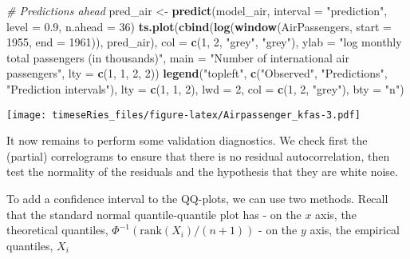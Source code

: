\documentclass[]{book}
\newenvironment{Shaded}{\begin{snugshade}}{\end{snugshade}}
\newcommand{\CommentTok}[1]{\textcolor[rgb]{0.56,0.35,0.01}{\textit{#1}}}
\newcommand{\DataTypeTok}[1]{\textcolor[rgb]{0.13,0.29,0.53}{#1}}
\newcommand{\DecValTok}[1]{\textcolor[rgb]{0.00,0.00,0.81}{#1}}
\newcommand{\FloatTok}[1]{\textcolor[rgb]{0.00,0.00,0.81}{#1}}
\newcommand{\KeywordTok}[1]{\textcolor[rgb]{0.13,0.29,0.53}{\textbf{#1}}}
\newcommand{\NormalTok}[1]{#1}
\newcommand{\StringTok}[1]{\textcolor[rgb]{0.31,0.60,0.02}{#1}}
\begin{document}
\begin{Shaded}
\begin{Highlighting}[]
\CommentTok{# Predictions ahead}
\NormalTok{pred_air <-}\StringTok{ }\KeywordTok{predict}\NormalTok{(model_air, }\DataTypeTok{interval =} \StringTok{"prediction"}\NormalTok{, }\DataTypeTok{level =} \FloatTok{0.9}\NormalTok{, }\DataTypeTok{n.ahead =} \DecValTok{36}\NormalTok{)}
\KeywordTok{ts.plot}\NormalTok{(}\KeywordTok{cbind}\NormalTok{(}\KeywordTok{log}\NormalTok{(}\KeywordTok{window}\NormalTok{(AirPassengers, }\DataTypeTok{start =} \DecValTok{1955}\NormalTok{, }\DataTypeTok{end =} \DecValTok{1961}\NormalTok{)), pred_air), }
    \DataTypeTok{col =} \KeywordTok{c}\NormalTok{(}\DecValTok{1}\NormalTok{, }\DecValTok{2}\NormalTok{, }\StringTok{"grey"}\NormalTok{, }\StringTok{"grey"}\NormalTok{), }\DataTypeTok{ylab =} \StringTok{"log monthly total passengers (in thousands)"}\NormalTok{, }
    \DataTypeTok{main =} \StringTok{"Number of international air passengers"}\NormalTok{, }\DataTypeTok{lty =} \KeywordTok{c}\NormalTok{(}\DecValTok{1}\NormalTok{, }\DecValTok{1}\NormalTok{, }\DecValTok{2}\NormalTok{, }\DecValTok{2}\NormalTok{))}
\KeywordTok{legend}\NormalTok{(}\StringTok{"topleft"}\NormalTok{, }\KeywordTok{c}\NormalTok{(}\StringTok{"Observed"}\NormalTok{, }\StringTok{"Predictions"}\NormalTok{, }\StringTok{"Prediction intervals"}\NormalTok{), }\DataTypeTok{lty =} \KeywordTok{c}\NormalTok{(}\DecValTok{1}\NormalTok{, }
    \DecValTok{1}\NormalTok{, }\DecValTok{2}\NormalTok{), }\DataTypeTok{lwd =} \DecValTok{2}\NormalTok{, }\DataTypeTok{col =} \KeywordTok{c}\NormalTok{(}\DecValTok{1}\NormalTok{, }\DecValTok{2}\NormalTok{, }\StringTok{"grey"}\NormalTok{), }\DataTypeTok{bty =} \StringTok{"n"}\NormalTok{)}
\end{Highlighting}
\end{Shaded}

\texttt{[image: timeseRies\_files/figure-latex/Airpassenger\_kfas-3.pdf]}

It now remains to perform some validation diagnostics. We check first
the (partial) correlograms to ensure that there is no residual
autocorrelation, then test the normality of the residuals and the
hypothesis that they are white noise.

To add a confidence interval to the QQ-plots, we can use two methods.
Recall that the standard normal quantile-quantile plot has - on the
\(x\) axis, the theoretical quantiles,
\(\Phi^{-1}(\mathrm{rank}(X_i)/(n+1))\) - on the \(y\) axis, the
empirical quantiles, \(X_i\)
\end{document}
